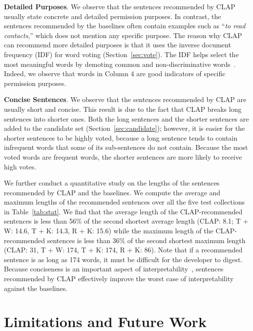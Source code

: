 {\bf Detailed Purposes}. 
We observe that the sentences recommended by CLAP usually state concrete and detailed permission purposes. 
In contrast, the sentences recommended by the baselines often contain examples such as ``\emph{to read contacts},'' which does not mention any specific purpose. 
The reason why CLAP can recommend more detailed purposes is that it uses the inverse document frequency (IDF) for word voting (Section~\ref{sec:vote}). The IDF helps select the most meaningful words by demoting common and non-discriminative words~\cite{idf}. 
Indeed, we observe that words in Column 4 are good indicators of specific permission purposes. 

{\bf Concise Sentences}. 
We observe that the sentences recommended by CLAP are usually short and concise. 
This result is due to the fact that CLAP breaks long sentences into shorter ones. 
Both the long sentences and the shorter sentences are added to the candidate set (Section~\ref{sec:candidate}); 
however, it is easier for the shorter sentences to be highly voted, because a long sentence tends to contain infrequent words that some of its sub-sentences do not contain. 
Because the most voted words are frequent words, the shorter sentences are more likely to receive high votes. 

We further conduct a quantitative study on the lengths of the sentences recommended by CLAP and the baselines. 
We compute the average and maximum lengths of the recommended sentences over all the five test collections in Table~\ref{tab:stat}. 
We find that the average length of the CLAP-recommended sentences is less than 56\% of the second shortest average length (CLAP: 8.1; T + W: 14.6, T + K: 14.3, R + K: 15.6) while the maximum length of the CLAP-recommended sentences is less than 36\% of the second shortest maximum length (CLAP: 31, T + W: 174, T + K: 174, R + K: 86). 
Note that if a recommended sentence is as long as 174 words, it must be difficult for the developer to digest. 
Because conciseness is an important aspect of interpretability~\cite{conf/kdd/LakkarajuBL16}, sentences recommended by CLAP effectively improve the worst case of interpretability against the baselines. 



\section{Limitations and Future Work}
\label{sec:discussion}

